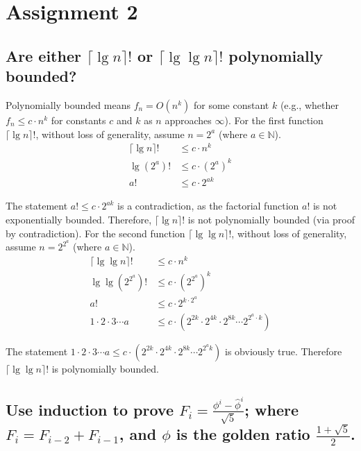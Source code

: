 \chapter{Assignment 2}


\section[Problem 1]{Are either $\lceil \lg n \rceil!$ or $\lceil \lg \lg n \rceil!$ polynomially bounded?}
Polynomially bounded means $f_n = O(n^k)$ for some constant $k$ (e.g., whether $f_n \leq c \cdot n^k$ for constants $c$ and $k$ as $n$ approaches $\infty$). For the first function $\lceil \lg n \rceil!$, without loss of generality, assume $n = 2^a$ (where $a \in \mathbb{N}$). 
\begin{align*}
	\lceil \lg n \rceil ! & \leq c \cdot n^k \\
	\lg (2^a) ! & \leq c \cdot (2^a)^k \\
	a! & \leq c \cdot 2^{ak}
\end{align*}

The statement $a! \leq c \cdot 2^{ak}$ is a contradiction, as the factorial function $a!$ is not exponentially bounded. Therefore, $\lceil \lg n \rceil!$ is not polynomially bounded (via proof by contradiction). For the second function $\lceil \lg \lg n \rceil!$, without loss of generality, assume $n = 2^{2^a}$ (where $a \in \mathbb{N}$).
\begin{align*}
	 \lceil \lg \lg n \rceil! & \leq c \cdot n^k \\
	 \lg \lg \left( 2^{2^a} \right) ! & \leq c \cdot \left( 2^{2^a} \right)^k \\
	 a! & \leq c \cdot 2^{k \cdot {2^a}} \\
	 1 \cdot 2 \cdot 3 \cdots a & \leq c \cdot \left( 2^{2k} \cdot 2^{4k} \cdot 2^{8k} \cdots 2^{2^a \cdot k} \right)
\end{align*}

The statement $1 \cdot 2 \cdot 3 \cdots a \leq c \cdot \left( 2^{2k} \cdot 2^{4k} \cdot 2^{8k} \cdots 2^{2^a k} \right)$ is obviously true. Therefore $\lceil \lg \lg n \rceil!$ is polynomially bounded.



\section[Problem 2]{Use induction to prove $F_i = \frac{\phi^i - \hat{\phi}^i}{\sqrt{5}}$; where $F_i = F_{i-2} + F_{i-1}$, and $\phi$ is the golden ratio $\frac{1 + \sqrt{5}}{2}$.}

